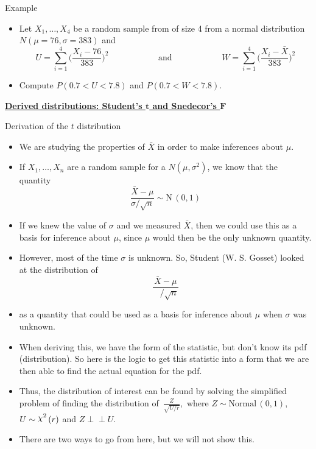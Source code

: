 \documentclass{article}
\newcommand{\bu}[1]{\textbf{\ul{#1}}}				%
\newcommand{\vecn}[2]{#1_1, \ldots, #1_{#2}}	%
\newcommand{\ind}{\perp \!\!\! \perp}			%
\newcommand{\follow}[1]{\sim \text{#1}\,}		%
\newcommand{\chisq}{\raisebox{2pt}{$\chi^2$}}		%
\begin{document}
Example\bigskip
\begin{itemize}
    \item Let $\vecn{X}{4}$ be a random sample from of size 4 from a normal distribution \\ $N(\mu = 76, \sigma = 383)$ and
    \[U = \sum_{i = 1}^4 \Big(\frac{X_i - 76}{383}\Big)^2 \hspace{70pt} \text{and} \hspace{70pt} W = \sum_{i = 1}^4 \Big(\frac{X_i - \bar{X}}{383}\Big)^2\]
    \item[] Compute $P(0.7 < U < 7.8)$ and $P(0.7 < W < 7.8)$.
\end{itemize}\bigskip

\bu{Derived distributions: Student's $\boldsymbol{t}$ and Snedecor's $\boldsymbol{F}$}\bigskip

Derivation of the $t$ distribution\bigskip
\begin{itemize}
    \item We are studying the properties of $\bar{X}$ in order to make inferences about $\mu$.
    \item If $\vecn{X}{n}$ are a random sample for a $N(\mu, \sigma^2)$, we know that the quantity
    \[\frac{\bar{X} - \mu}{\sigma / \sqrt{n}} \follow{N}(0, 1)\]
    \item If we knew the value of $\sigma$ and we measured $\bar{X}$, then we could use this as a basis for inference about $\mu$, since $\mu$ would then be the only unknown quantity.
    \item[] However, most of the time $\sigma$ is unknown. So, Student (W. S. Gosset) looked at the distribution of 
    \[\frac{\bar{X} - \mu}{\hspace{10pt} / \sqrt{n}}\]
    \item[] as a quantity that could be used as a basis for inference about $\mu$ when $\sigma$ was unknown.
    \item When deriving this, we have the form of the statistic, but don't know its pdf (distribution). So here is the logic to get this statistic into a form that we are then able to find the actual equation for the pdf.\vspace{300pt}
    \item Thus, the distribution of interest can be found by solving the simplified problem of finding the distribution of \,$\displaystyle \frac{Z}{\sqrt{U / r}}$, \,where $Z \follow{Normal}(0, 1)$, $U \follow{\chisq}(r)$ and $Z \ind U$.
    \item[] There are two ways to go from here, but we will not show this.
\end{itemize}\bigskip
\end{document}
